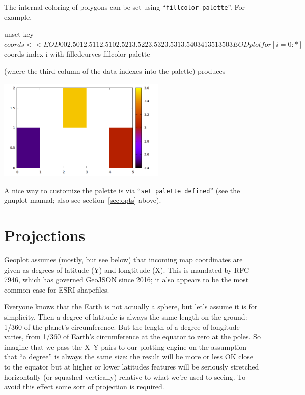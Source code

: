\documentclass{article}
\newcommand{\myappendix}[1]{%
\addtocounter{appcount}{1}
\section{#1}}
\begin{document}
\medskip

The internal coloring of polygons can be set using ``\texttt{fillcolor
  palette}''. For example,
\begin{code}
unset key
$coords << EOD
0 0 2.5
0 1 2.5
1 1 2.5
1 0 2.5

2 1 3.5
2 2 3.5
3 2 3.5
3 1 3.5

4 0 3
4 1 3
5 1 3
5 0 3
EOD
plot for [i=0:*] $coords index i with filledcurves fillcolor palette
\end{code}
(where the third column of the data indexes into the palette) produces
\begin{center}
  \includegraphics[width=0.6\textwidth]{squares}
\end{center}

A nice way to customize the palette is via ``\texttt{set
  palette defined}'' (see the \textsf{gnuplot} manual; also see
section~\ref{sec:opts} above).

\clearpage
\myappendix{Projections}
\label{app:proj}

\textsf{Geoplot} assumes (mostly, but see below) that incoming map
coordinates are given as degrees of latitude (Y) and longtitude
(X). This is mandated by RFC 7946, which has governed GeoJSON since
2016; it also appears to be the most common case for ESRI shapefiles.

Everyone knows that the Earth is not actually a sphere, but let's
assume it is for simplicity. Then a degree of latitude is always the
same length on the ground: 1/360 of the planet's circumference. But
the length of a degree of longitude varies, from 1/360 of Earth's
circumference at the equator to zero at the poles. So imagine that we
pass the X--Y pairs to our plotting engine on the assumption that ``a
degree'' is always the same size: the result will be more or less OK
close to the equator but at higher or lower latitudes features will be
seriously stretched horizontally (or squashed vertically) relative to
what we're used to seeing. To avoid this effect some sort of
projection is required.
\end{document}

